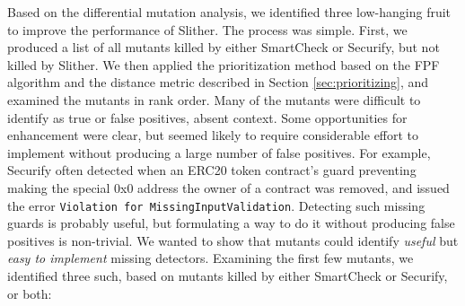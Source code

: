 Based on the differential mutation analysis, we identified three low-hanging fruit to improve the performance of Slither.  The process was simple.  First, we produced a list of all mutants killed by either SmartCheck or Securify, but not killed by Slither.  We then applied the prioritization method based on the FPF algorithm and the distance metric described in Section \ref{sec:prioritizing}, and examined the mutants in rank order.  Many of the mutants were difficult to identify as true or false positives, absent context.  Some opportunities for enhancement were clear, but seemed likely to require considerable effort to implement without producing a large number of false positives.  For example, Securify often detected when an ERC20 token contract's guard preventing making the special 0x0 address the owner of a contract was removed, and issued the error {\tt Violation for MissingInputValidation}. Detecting such missing guards is probably useful, but formulating a way to do it without producing false positives is non-trivial.  We wanted to show that mutants could identify \emph{useful} but \emph{easy to implement} missing detectors.  Examining the first few mutants, we identified three such, based on mutants killed by either SmartCheck or Securify, or both:


